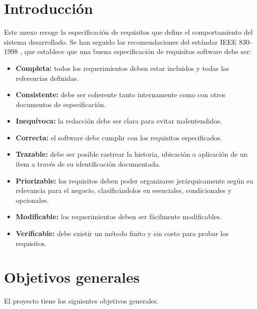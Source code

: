 
\section{Introducción}\label{intoduccion}

Este anexo recoge la especificación de requisitos que define el comportamiento del sistema desarrollado. Se han seguido las recomendaciones del estándar IEEE 830-1998 \cite{ieee}, que establece que una buena especificación de requisitos software debe ser:

\begin{itemize}
    \item \textbf{Completa:} todos los requerimientos deben estar incluidos y todas las referencias definidas.
    \item \textbf{Consistente:} debe ser coherente tanto internamente como con otros documentos de especificación.
    \item \textbf{Inequívoca:} la redacción debe ser clara para evitar malentendidos.
    \item \textbf{Correcta:} el software debe cumplir con los requisitos especificados.
    \item \textbf{Trazable:} debe ser posible rastrear la historia, ubicación o aplicación de un ítem a través de su identificación documentada.
    \item \textbf{Priorizable:} los requisitos deben poder organizarse jerárquicamente según su relevancia para el negocio, clasificándolos en esenciales, condicionales y opcionales.
    \item \textbf{Modificable:} los requerimientos deben ser fácilmente modificables.
    \item \textbf{Verificable:} debe existir un método finito y sin costo para probar los requisitos.
\end{itemize}

\section{Objetivos generales}\label{objetivos-generales}

El proyecto tiene los siguientes objetivos generales.

